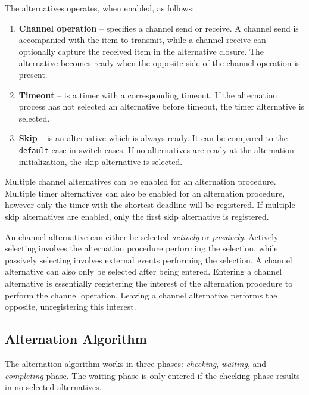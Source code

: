 The alternatives operates, when enabled, as follows:

\begin{enumerate}[topsep=0em,itemsep=-1em,partopsep=0.5em,parsep=1em]
    \item \textbf{Channel operation} -- specifies a channel send or receive. A channel send is accompanied with the item to transmit, while a channel receive can optionally capture the received item in the alternative closure. The alternative becomes ready when the opposite side of the channel operation is present.
    \item \textbf{Timeout} -- is a timer with a corresponding timeout. If the alternation process has not selected an alternative before timeout, the timer alternative is selected.
    \item \textbf{Skip} -- is an alternative which is always ready. It can be compared to the \texttt{default} case in switch cases. If no alternatives are ready at the alternation initialization, the skip alternative is selected. 
\end{enumerate}

Multiple channel alternatives can be enabled for an alternation procedure. Multiple timer alternatives can also be enabled for an alternation procedure, however only the timer with the shortest deadline will be registered. If multiple skip alternatives are enabled, only the first skip alternative is registered.

An channel alternative can either be selected \textit{actively} or \textit{passively}. Actively selecting involves the alternation procedure performing the selection, while passively selecting involves external events performing the selection. A channel alternative can also only be selected after being entered. Entering a channel alternative is essentially registering the interest of the alternation procedure to perform the channel operation. Leaving a channel alternative performs the opposite, unregistering this interest.


\subsection{Alternation Algorithm}
\label{subsec:alternation_algorithm}

The alternation algorithm works in three phases: \textit{checking}, \textit{waiting}, and \textit{completing} phase. The waiting phase is only entered if the checking phase results in no selected alternatives.

